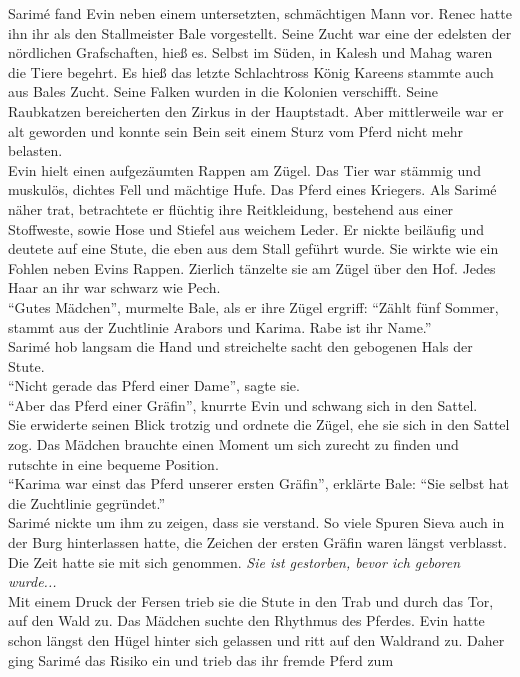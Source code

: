 Sarimé fand Evin neben einem untersetzten, schmächtigen Mann vor. Renec hatte ihn ihr als den 
Stallmeister Bale vorgestellt. Seine Zucht war eine der edelsten der nördlichen Grafschaften, hieß 
es. Selbst im Süden, in Kalesh und Mahag waren die Tiere begehrt. Es hieß das letzte Schlachtross 
König Kareens stammte auch aus Bales Zucht. Seine Falken wurden in die Kolonien verschifft. Seine 
Raubkatzen bereicherten den Zirkus in der Hauptstadt. Aber mittlerweile war er alt geworden und 
konnte sein Bein seit einem Sturz vom Pferd nicht mehr belasten.\\
Evin hielt einen aufgezäumten Rappen am Zügel. Das Tier war stämmig und muskulös, dichtes Fell und 
mächtige Hufe. Das Pferd eines Kriegers. Als Sarimé näher trat, betrachtete er flüchtig ihre 
Reitkleidung, bestehend aus einer Stoffweste, sowie Hose und Stiefel aus weichem Leder. Er nickte 
beiläufig und deutete auf eine Stute, die eben aus dem Stall geführt wurde. Sie wirkte wie ein 
Fohlen neben Evins Rappen. Zierlich tänzelte sie am Zügel über den Hof. Jedes Haar an ihr war 
schwarz wie Pech.\\
``Gutes Mädchen'', murmelte Bale, als er ihre Zügel ergriff: ``Zählt fünf Sommer, stammt aus der 
Zuchtlinie Arabors und Karima. Rabe ist ihr Name.''\\
Sarimé hob langsam die Hand und streichelte sacht den gebogenen Hals der Stute.\\
``Nicht gerade das Pferd einer Dame'', sagte sie.\\
``Aber das Pferd einer Gräfin'', knurrte Evin und schwang sich in den Sattel.\\
Sie erwiderte seinen Blick trotzig und ordnete die Zügel, ehe sie sich in den Sattel zog. Das 
Mädchen brauchte einen Moment um sich zurecht zu finden und rutschte in eine bequeme Position.\\
``Karima war einst das Pferd unserer ersten Gräfin'', erklärte Bale: ``Sie selbst hat die 
Zuchtlinie gegründet.''\\
Sarimé nickte um ihm zu zeigen, dass sie verstand. So viele Spuren Sieva auch in der Burg 
hinterlassen hatte, die Zeichen der ersten Gräfin waren längst verblasst. Die Zeit hatte sie mit 
sich genommen. \textit{Sie ist gestorben, bevor ich geboren wurde...}\\
Mit einem Druck der Fersen trieb sie die Stute in den Trab und durch das Tor, auf den Wald zu. Das 
Mädchen suchte den Rhythmus des Pferdes. Evin hatte schon längst den Hügel hinter sich gelassen und 
ritt auf den Waldrand zu. Daher ging Sarimé das Risiko ein und trieb das ihr fremde Pferd zum 
